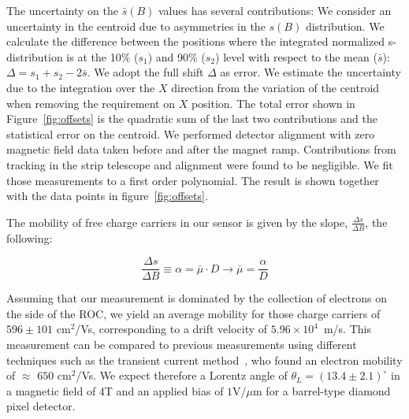 \documentclass[journal]{IEEEtran}
\begin{document}
The uncertainty on the $\bar{s}(B)$ values has several contributions:
We consider an uncertainty in the centroid due to asymmetries in the $s(B)$ distribution.  We calculate the difference between the positions where the integrated normalized s-distribution is at the 10\% ($s_1$) and 90\% ($s_2$) level with respect to the mean ($\bar{s}$): $\Delta = s_1 + s_2 - 2\bar{s}$. We adopt the full shift $\Delta$ as error. We estimate the uncertainty due to the integration over the $X$ direction from the variation of the centroid when removing the requirement on $X$ position. The total error shown in Figure~\ref{fig:offsets} is the quadratic sum of the last two contributions and the statistical error on the centroid.    We performed detector alignment with zero magnetic field
data taken before and after the magnet ramp.
Contributions from tracking in the strip telescope and 
alignment were found to be negligible. 
We fit those measurements to a first order polynomial. The result is shown together with the data points in
figure~\ref{fig:offsets}.



The mobility of free charge carriers in our sensor is given by the
slope, $\frac{\Delta s}{\Delta B}$, the following:

\begin{equation}
\frac{\Delta s}{\Delta B} \equiv \alpha = \bar{\mu} \cdot D \rightarrow \bar{\mu} = \frac{\alpha}{D}
\end{equation}

Assuming that our measurement is dominated by the collection of electrons on the side of the ROC, we yield an average mobility for those charge carriers of  $596 \pm 101 $ cm$^2$/Vs, corresponding to a drift velocity of $5.96 \times 10^4$~m/s.  This measurement can be compared to previous measurements using different techniques such as the transient current method~\cite{diamond-mobility}, who found an electron mobility of $\approx$ $650$ cm$^2$/Vs.  We expect therefore a Lorentz angle of $\theta_L = (13.4 \pm 2.1)^\circ$  in a magnetic field of 4T and an applied bias of $1$V/$\mu$m for a barrel-type diamond pixel detector.
\end{document}
